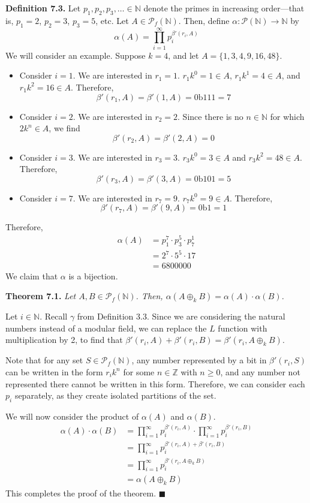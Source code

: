 \documentclass{article}
\newcommand{\zee}{\mathbb{Z}}
\newcommand{\N}{\mathbb{N}}
\begin{document}
\textbf{Definition 7.3.} Let
$p_1, p_2, p_3, \ldots \in \N$ denote the primes in increasing
order---that is, $p_1 = 2$, $p_2 = 3$, $p_3 = 5$, etc.
Let $A \in \mathcal{P}_f(\N)$.
Then, define $\alpha: \mathcal{P}(\N) \rightarrow \N$ by
\[\alpha(A) = \prod_{i=1}^\infty p_i^{\beta'(r_i, A)}\]
We will consider an example. Suppose $k = 4$, and let
$A = \{1, 3, 4, 9, 16, 48\}$.
\begin{itemize}
    \item Consider $i = 1$. We are interested in $r_1 = 1$.
    $r_1k^0 = 1 \in A$,
    $r_1k^1 = 4 \in A$, and $r_1k^2 = 16 \in A$.
    Therefore,
    \[\beta'(r_1, A) = \beta'(1, A) = \text{0b111} = 7\]
    \item Consider $i = 2$. We are interested in $r_2 = 2$.
    Since there is no $n \in \N$ for which $2k^n \in A$,
    we find
    \[\beta'(r_2, A) = \beta'(2, A) = 0\]
    \item Consider $i = 3$. We are interested in $r_3 = 3$.
    $r_3k^0 = 3 \in A$ and $r_3k^2 = 48 \in A$.
    Therefore,
    \[\beta'(r_3, A) = \beta'(3, A) = \text{0b101} = 5\]
    \item Consider $i = 7$. We are interested in $r_7 = 9$.
    $r_7k^0 = 9 \in A$. Therefore,
    \[\beta'(r_7, A) = \beta'(9, A) = \text{0b1} = 1\]
\end{itemize}
Therefore,
\[\begin{split}
    \alpha(A) &= p_1^7 \cdot p_3^5 \cdot p_7^1 \\
    &= 2^7 \cdot 5^5 \cdot 17 \\
    &= 6800000
\end{split}\]
We claim that $\alpha$ is a bijection.

\textbf{Theorem 7.1.} \textit{Let $A, B \in \mathcal{P}_f(\N)$.
Then, $\alpha(A \oplus_k B) = \alpha(A) \cdot \alpha(B)$.}

Let $i \in \N$.
Recall $\gamma$ from Definition 3.3.
Since we are considering the natural numbers
instead of a modular field, we can replace the $L$ function
with multiplication by 2, to find that
$\beta'(r_i, A) + \beta'(r_i, B) = \beta'(r_i, A \oplus_k B)$.

Note that for any set $S \in \mathcal{P}_f(\N)$,
any number represented by a bit in
$\beta'(r_i, S)$ can be written in the form $r_ik^n$
for some $n \in \zee$ with $n \geq 0$, and any number
not represented there cannot be written in this form.
Therefore, we can consider each $p_i$ separately,
as they create isolated partitions of the set.

We will now consider the product of $\alpha(A)$ and $\alpha(B)$.
\[\begin{split}
    \alpha(A) \cdot \alpha(B) &=
    \prod_{i=1}^\infty p_i^{\beta'(r_i, A)}
    \cdot \prod_{i=1}^\infty p_i^{\beta'(r_i, B)} \\
    &= \prod_{i=1}^\infty p_i^{\beta'(r_i, A) + \beta'(r_i, B)} \\
    &= \prod_{i=1}^\infty p_i^{\beta'(r_i, A \oplus_k B)} \\
    &= \alpha(A \oplus_k B)
\end{split}\]
This completes the proof of the theorem. $\blacksquare$
\end{document}
